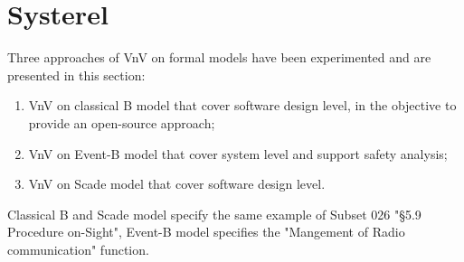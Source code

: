\documentclass{template/openetcs_article}
\begin{document}
\newpage


\let\oldparagraph\paragraph
\let\oldsubparagraph\subparagraph

\renewcommand{\paragraph}[1]{\subsection{#1}}
\renewcommand{\subparagraph}[1]{\subsubsection{#1}}



\newpage



\newpage



\newpage


\let\paragraph\oldparagraph
\let\paragraph\oldsubparagraph


\section{Systerel}

Three approaches of VnV  on formal models have been experimented and are
presented in this section:

\begin{enumerate}
\item VnV on classical B  model that cover software design level, in the objective to provide an open-source approach;
\item VnV on Event-B model that cover system level and support safety analysis;
\item VnV on Scade model that cover software design level.
\end{enumerate}

Classical B and Scade model specify the same example of Subset 026 "§5.9
Procedure on-Sight", Event-B model specifies the "Mangement of Radio
communication" function.
\end{document}
